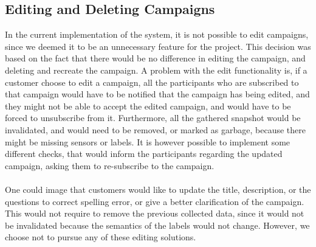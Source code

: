 \subsection{Editing and Deleting Campaigns}
\label{sub:editing_and_deleting_campaigns}

In the current implementation of the system, it is not possible to edit campaigns, since we deemed it to be an unnecessary feature for the project. This decision was based on the fact that there would be no difference in editing the campaign, and deleting and recreate the campaign. A problem with the edit functionality is, if a customer choose to edit a campaign, all the participants who are subscribed to that campaign would have to be notified that the campaign has being edited, and they might not be able to accept the edited campaign, and would have to be forced to unsubscribe from it. Furthermore, all the gathered snapshot would be invalidated, and would need to be removed, or marked as garbage, because there might be missing sensors or labels. It is however possible to implement some different checks, that would inform the participants regarding the updated campaign, asking them to re-subscribe to the campaign. 
\\\\
One could image that customers would like to update the title, description, or the questions to correct spelling error, or give a better clarification of the campaign. This would not require to remove the previous collected data, since it would not be invalidated because the semantics of the labels would not change. However, we choose not to pursue any of these editing solutions.

